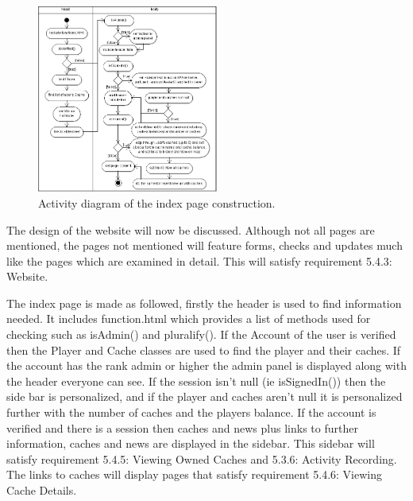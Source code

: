 \begin{figure}
    \includegraphics[width=0.53\textwidth]{images/activity/IndexHTML}
    \caption{Activity diagram of the index page construction.}
\end{figure}

The design of the website will now be discussed. Although not all pages are mentioned, the pages not mentioned will feature forms, checks and updates much like the pages which are examined in detail. This will satisfy requirement 5.4.3: Website.

The index page is made as followed, firstly the header is used to find information needed. It includes function.html which provides a list of methods used for checking such as isAdmin() and pluralify(). If the Account of the user is verified then the Player and Cache classes are used to find the player and their caches. If the account has the rank admin or higher the admin panel is displayed along with the header everyone can see. If the session isn't null (ie isSignedIn()) then the side bar is personalized, and if the player and caches aren't null it is personalized further with the number of caches and the players balance. If the account is verified and there is a session then caches and news plus links to further information, caches and news are displayed in the sidebar. This sidebar will satisfy requirement 5.4.5: Viewing Owned Caches and 5.3.6: Activity Recording. The links to caches will display pages that satisfy requirement 5.4.6: Viewing Cache Details.

